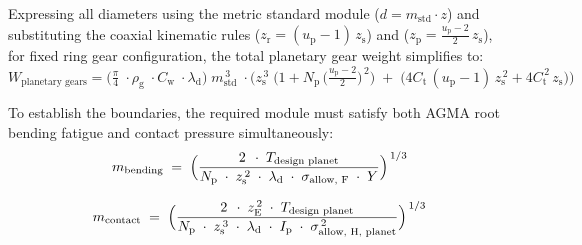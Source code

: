 \begin{itemize}
                Expressing all diameters using the metric standard module (\( d = m_{\text{std}}\!\cdot\! z \))
                and substituting the coaxial kinematic rules (\( z_{\text{r}} = (u_{\text{p}}-1)\,z_{\text{s}}\))
                and (\( z_{\text{p}} = \frac{u_{\text{p}}-2}{2}\,z_{\text{s}} \)), for fixed ring gear 
                configuration, the total planetary gear weight simplifies to:
                    \begin{equation}
                        \label{eq:totalplanetarygearsmass1}
                        W_{\text{planetary gears}}
                        = \bigl(\tfrac{\pi}{4}\;\cdot \rho_{\text{g}}\;\cdot C_{\text{w}}\;\cdot \lambda_{\text{d}}\bigr)\;
                        m_{\text{std}}^{\,3}\;\cdot
                        \bigl(z_{\text{s}}^{\,3}\;
                        \bigl( 1 + N_{\text{p}}\,
                        \bigl(\tfrac{u_{\text{p}}-2}{2}\bigr)^{\,2}\bigr)
                        \;+\;
                        \bigl(4C_{\text{t}}\,(u_{\text{p}}-1)\,z_{\text{s}}^{\,2} + 4C_{\text{t}}^{\,2}\,z_{\text{s}}\bigr)\bigr)
                    \end{equation}
                
                To establish the boundaries, the required module must satisfy both AGMA root bending fatigue and contact 
                pressure simultaneously:
                    \begin{equation}
                        \label{eq:mbending}
                        m_{\text{bending}}
                        \;=\;
                        \Bigl(
                            \frac{2\,\;\cdot\;T_{\text{design planet}}}{N_{\text{p}}
                            \;\cdot\;
                            z_{\text{s}}^{\,2}
                            \;\cdot\;
                            \lambda_{\text{d}}
                            \;\cdot\;
                            \sigma_{\text{allow, F}}
                            \;\cdot\;
                            Y}
                        \Bigr)^{\,1/3}
                    \end{equation}

                    \begin{equation}
                        \label{eq:mcontact}
                        m_{\text{contact}}
                        \;=\;
                        \Bigl(
                        \frac{2\,\;\cdot\;z_{\text{E}}^{\,2}\;\cdot\;T_{\text{design planet}}}{N_{\text{p}}
                        \;\cdot\;
                        z_{\text{s}}^{\,3}
                        \;\cdot\;
                        \lambda_{\text{d}}
                        \;\cdot\;
                        I_{\text{p}}
                        \;\cdot\;
                        \sigma_{\text{allow, H, planet}}^{\,2}}
                        \Bigr)^{\,1/3}
                    \end{equation}


\end{itemize}
